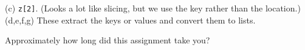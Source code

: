 \documentclass[11pt]{exam}
\begin{document}
\begin{questions}
\begin{solution}
(c) \verb|z[2]|.  (Looks a lot like slicing, but we use the key rather than the location.)
(d,e,f,g) These extract the keys or values and convert them to lists.
\end{solution}


\item Approximately how long did this assignment take you?

\end{questions}


\end{document}
